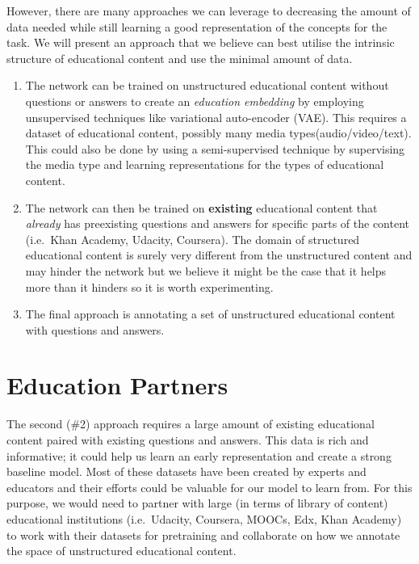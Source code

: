 \documentclass[]{book}
\theoremstyle{definition}
\theoremstyle{definition}
\theoremstyle{definition}
\theoremstyle{remark}
\begin{document}
However, there are many approaches we can leverage to decreasing the
amount of data needed while still learning a good representation of the
concepts for the task. We will present an approach that we believe can
best utilise the intrinsic structure of educational content and use the
minimal amount of data.

\begin{enumerate}
\def\labelenumi{\arabic{enumi}.}
\item
  The network can be trained on unstructured educational content without
  questions or answers to create an \emph{education embedding} by
  employing unsupervised techniques like variational auto-encoder (VAE).
  This requires a dataset of educational content, possibly many media
  types(audio/video/text). This could also be done by using a
  semi-supervised technique by supervising the media type and learning
  representations for the types of educational content.
\item
  The network can then be trained on \textbf{existing} educational
  content that \emph{already} has preexisting questions and answers for
  specific parts of the content (i.e.~Khan Academy, Udacity, Coursera).
  The domain of structured educational content is surely very different
  from the unstructured content and may hinder the network but we
  believe it might be the case that it helps more than it hinders so it
  is worth experimenting.
\item
  The final approach is annotating a set of unstructured educational
  content with questions and answers.
\end{enumerate}

\section{Education Partners}\label{education-partners}

The second (\#2) approach requires a large amount of existing
educational content paired with existing questions and answers. This
data is rich and informative; it could help us learn an early
representation and create a strong baseline model. Most of these
datasets have been created by experts and educators and their efforts
could be valuable for our model to learn from. For this purpose, we
would need to partner with large (in terms of library of content)
educational institutions (i.e.~Udacity, Coursera, MOOCs, Edx, Khan
Academy) to work with their datasets for pretraining and collaborate on
how we annotate the space of unstructured educational content.
\end{document}
